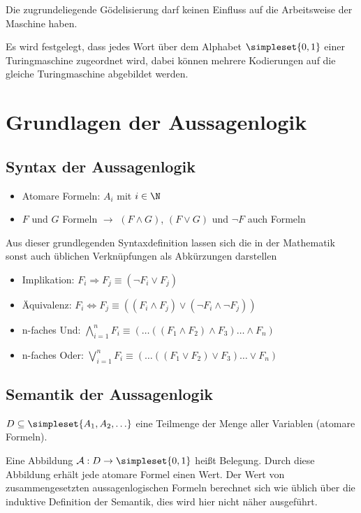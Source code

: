 Die zugrundeliegende Gödelisierung darf keinen Einfluss auf die Arbeitsweise der Maschine haben.

Es wird festgelegt, dass jedes Wort über dem Alphabet $\simpleset{0,1}$ einer Turingmaschine zugeordnet wird, dabei können mehrere Kodierungen auf die gleiche Turingmaschine abgebildet werden.


\section{Grundlagen der Aussagenlogik}
\subsection{Syntax der Aussagenlogik}
\begin{itemize}
	\item Atomare Formeln: $A_i$ mit $i\in\N$
	\item $F$ und $G$ Formeln $\rightarrow$ $(F\wedge G)$, $(F\vee G)$ und $\neg F$ auch Formeln
\end{itemize}

Aus dieser grundlegenden Syntaxdefinition lassen sich die in der Mathematik sonst auch üblichen Verknüpfungen als Abkürzungen darstellen
\begin{itemize}
	\item Implikation: $F_i\Rightarrow F_j \equiv (\neg F_i\vee F_j)$
	\item Äquivalenz: $F_i\Leftrightarrow F_j \equiv ((F_i\wedge F_j)\vee(\neg F_i\wedge \neg F_j))$
	\item n-faches Und: $\bigwedge\limits_{i=1}^n F_i \equiv (\ldots((F_1\wedge F_2)\wedge F_3)\ldots \wedge F_n)$
	\item n-faches Oder: $\bigvee\limits_{i=1}^n F_i \equiv (\ldots((F_1\vee F_2)\vee F_3)\ldots \vee F_n)$
\end{itemize}

\subsection{Semantik der Aussagenlogik}
$D\subseteq\simpleset{A_1,A_2,\ldots}$ eine Teilmenge der Menge aller Variablen (atomare Formeln).

Eine Abbildung $\mathcal A:D\rightarrow\simpleset{0,1}$ heißt Belegung. Durch diese Abbildung erhält jede atomare Formel einen Wert. Der Wert von zusammengesetzten aussagenlogischen Formeln berechnet sich wie üblich über die induktive Definition der Semantik, dies wird hier nicht näher ausgeführt.

